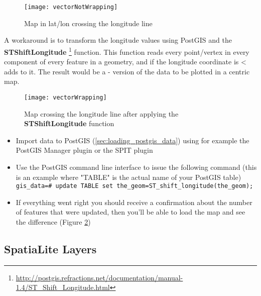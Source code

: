\begin{figure}[ht]
   \begin{center}
   \caption{Map in lat/lon crossing the  longitude line
   \nixcaption}
   \label{fig:vector_not_wrapping}\smallskip
   \texttt{[image: vectorNotWrapping]}
\end{center}
\end{figure}

A workaround is to transform the longitude values using PostGIS and the
\textbf{ST\textunderscore Shift\textunderscore Longitude}
\footnote{\url{http://postgis.refractions.net/documentation/manual-1.4/ST_Shift_Longitude.html}}
function. This function reads every point/vertex in every component of every
feature in a geometry, and if the longitude coordinate is <  adds
 to it. The result would be a  -  version of
the data to be plotted in a  centric map.

\begin{figure}[ht]
   \begin{center}
   \caption{Map crossing the  longitude line
after applying the \textbf{ST\textunderscore Shift\textunderscore Longitude}
function}
\label{fig:vector_wrapping}\smallskip
   \texttt{[image: vectorWrapping]}
\end{center}
\end{figure}


\begin{itemize}
\item Import data to PostGIS (\ref{sec:loading_postgis_data}) using for
example the PostGIS Manager plugin or the SPIT plugin
\item Use the PostGIS command line interface to issue the following command
(this is an example where "TABLE" is the actual name of your PostGIS table) \\ 
\texttt{gis\_data=\# update TABLE set the\_geom=ST\_shift\_longitude(the\_geom);} 
\item If everything went right you should receive a confirmation about the
number of features that were updated, then you'll be able to load the map and
see the difference (Figure \ref{fig:vector_wrapping})
\end{itemize}

\subsection{SpatiaLite Layers} 
\label{label_spatialite} 

